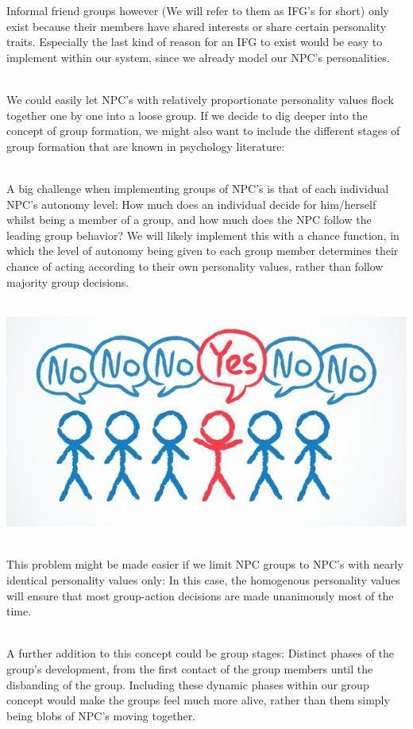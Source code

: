\documentclass[11pt]{article} %
\begin{document}
\newpage
Informal friend groups however  (We will refer to them as IFG's for short) only exist because their members have shared interests or share certain personality traits. Especially the last kind of reason for an IFG to exist would be easy to implement within our system, since we already model our NPC's personalities. 

~\\
We could easily let NPC's with relatively proportionate personality values flock together one by one into a loose group. If we decide to dig deeper into the concept of group formation, we might also want to include the different stages of group formation that are known in psychology literature: %

~\\
A big challenge when implementing groups of NPC's is that of each individual NPC's autonomy level: How much does an individual decide for him/herself whilst being a member of a group, and how much does the NPC follow the leading group behavior? We will likely implement this with a chance function, in which the level of autonomy being given to each group member determines their chance of acting according to their own personality values, rather than follow majority group decisions. 

~\\
\includegraphics[scale=0.7]{PeerPressure}



~\\
This problem might be made easier if we limit NPC groups to NPC's with nearly identical personality values only: In this case, the homogenous personality values will ensure that most group-action decisions are made unanimously most of the time.

~\\
A further addition to this concept could be group stages: Distinct phases of the group's development, from the first contact of the group members until the disbanding of the group. Including these dynamic phases within our group concept would make the groups feel much more alive, rather than them simply being blobs of NPC's moving together.
\end{document}
